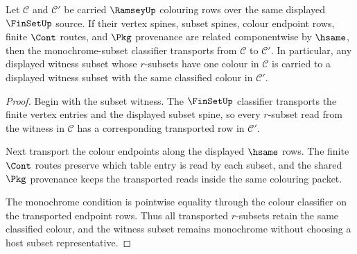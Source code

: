 \begin{theorem}
\label{thm:ramsey-monochrome-classifier-stability}
Let $\mathcal C$ and $\mathcal C'$ be carried $\RamseyUp$ colouring rows over
the same displayed $\FinSetUp$ source. If their vertex spines, subset spines,
colour endpoint rows, finite $\Cont$ routes, and $\Pkg$ provenance are related
componentwise by $\hsame$, then the monochrome-subset classifier transports
from $\mathcal C$ to $\mathcal C'$. In particular, any displayed witness subset
whose $r$-subsets have one colour in $\mathcal C$ is carried to a displayed
witness subset with the same classified colour in $\mathcal C'$.
\end{theorem}
\begin{proof}
Begin with the subset witness. The $\FinSetUp$ classifier transports the
finite vertex entries and the displayed subset spine, so every $r$-subset read
from the witness in $\mathcal C$ has a corresponding transported row in
$\mathcal C'$.

Next transport the colour endpoints along the displayed $\hsame$ rows. The
finite $\Cont$ routes preserve which table entry is read by each subset, and
the shared $\Pkg$ provenance keeps the transported reads inside the same
colouring packet.

The monochrome condition is pointwise equality through the colour classifier
on the transported endpoint rows. Thus all transported $r$-subsets retain the
same classified colour, and the witness subset remains monochrome without
choosing a host subset representative.
\end{proof}

